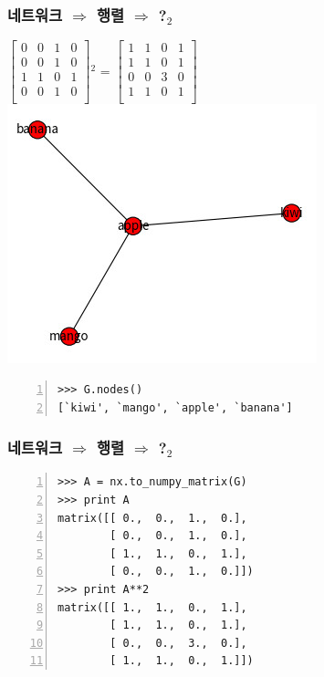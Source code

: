 \documentclass{beamer}
\begin{document}
\begin{frame}[fragile]
\frametitle{네트워크 $\Rightarrow$ 행렬 $\Rightarrow$ ?$_2$}
\begin{center}
\large
{\(
  \begin{bmatrix}
    0 & 0 & 1 & 0\\
    0 & 0 & 1 & 0\\
    1 & 1 & 0 & 1\\
    0 & 0 & 1 & 0\\
  \end{bmatrix}
\)$^2$}
=
\(
  \begin{bmatrix}
    1 & 1 & 0 & 1\\
    1 & 1 & 0 & 1\\
    0 & 0 & 3 & 0\\
    1 & 1 & 0 & 1\\
  \end{bmatrix}
\)
\includegraphics[scale=0.7]{network_basic1.jpg}
\end{center}
\begin{Verbatim}[numbers=left,commandchars=\\\{\}]
>>> G.nodes()
[`kiwi', `mango', `apple', `banana']
\end{Verbatim}
\end{frame}

\begin{frame}[fragile]
\frametitle{네트워크 $\Rightarrow$ 행렬 $\Rightarrow$ ?$_2$}
\begin{block}{}
	\begin{Verbatim}[numbers=left,commandchars=\\\{\}]
>>> A = nx.to_numpy_matrix(G)
>>> print A
matrix([[ 0.,  0.,  1.,  0.],
        [ 0.,  0.,  1.,  0.],
        [ 1.,  1.,  0.,  1.],
        [ 0.,  0.,  1.,  0.]])
>>> print A**2
matrix([[ 1.,  1.,  0.,  1.],
        [ 1.,  1.,  0.,  1.],
        [ 0.,  0.,  3.,  0.],
        [ 1.,  1.,  0.,  1.]])
	\end{Verbatim}
\end{block}
\end{frame}
\end{document}
